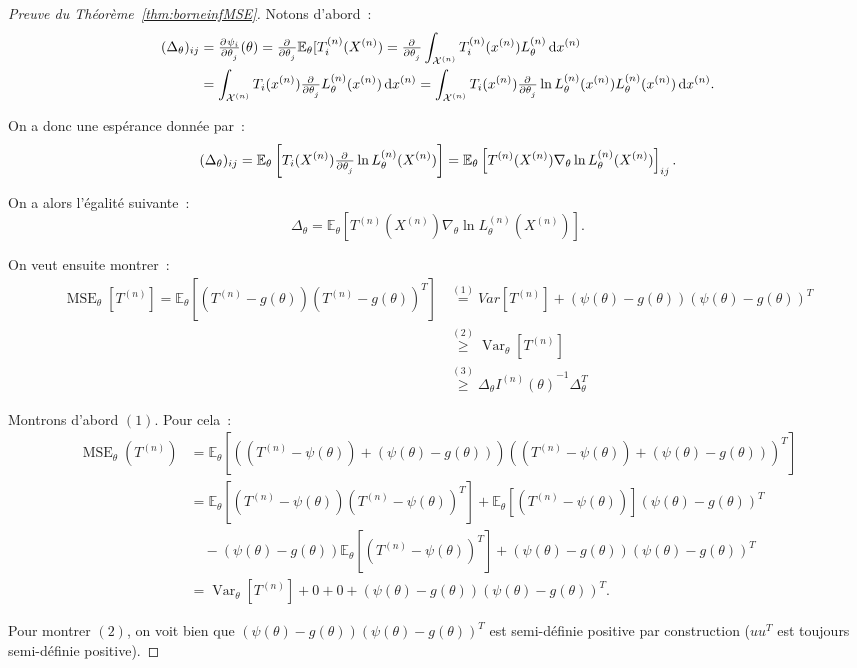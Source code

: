 \documentclass{report}
\DeclareMathOperator{\Var}{Var}
\DeclareMathOperator{\MSE}{MSE}
\newcommand{\E}{\mathbb E}
\newcommand{\n}{{(n)}}
\newcommand{\Xn}{{X^\n}}
\newcommand{\Tn}{{T^\n}}
\newcommand{\TnXn}{{\Tn(\Xn)}}
\theoremstyle{definition}
\theoremstyle{remark}
\begin{document}
			\begin{proof}[Preuve du Théorème~\ref{thm:borneinfMSE}] Notons d'abord~:
			\begin{align*} (\Delta_\theta)_{ij} &= \pd {\psi_i}{\theta_j}(\theta) = \pd {}{\theta_j}\E_\theta[T_i^{(n)}(\Xn)
				= \pd {}{\theta_j}\int_{\mathcal X^{(n)}}T_i^{(n)}(x^{(n)})L_\theta^{(n)}\dif x^{(n)} \\
			&= \int_{\mathcal X^{(n)}}T_i(x^{(n)})\pd {}{\theta_j}L_\theta^{(n)}(x^{(n)})\dif x^{(n)}
				= \int_{\mathcal X^{(n)}}T_i(x^{(n)})\pd {}{\theta_j}\ln L_\theta^{(n)}(x^{(n)})L_\theta^{(n)}(x^{(n)})\dif x^{(n)}.
			\end{align*}

			On a donc une espérance donnée par~:
			\[(\Delta_\theta)_{ij} = \E_\theta\left[T_i(X^{(n)})\pd {}{\theta_j}\ln L_\theta^{(n)}(X^{(n)})\right]
				= \E_\theta\left[\TnXn\nabla_\theta\ln L_\theta^{(n)}(X^{(n)})\right]_{ij}.\]

			On a alors l'égalité suivante~:
			\[\Delta_\theta = \E_\theta\left[\TnXn\nabla_\theta\ln L_\theta^{(n)}(X^{(n)})\right].\]

			On veut ensuite montrer~:
			\begin{align*}
				\MSE_\theta[\Tn] = \E_\theta\left[\left(\Tn - g(\theta)\right)\left(\Tn - g(\theta)\right)^T\right] &\overset {(1)}=
					Var[\Tn] + \left(\psi(\theta)-g(\theta)\right)\left(\psi(\theta)-g(\theta)\right)^T \\
				&\overset{(2)}\geq \Var_\theta[\Tn] \\
				&\overset{(3)}\geq \Delta_\theta{I^{(n)}(\theta)}^{-1}\Delta_\theta^T
			\end{align*}

			Montrons d'abord $(1)$. Pour cela~:
			\begin{align*}
				\MSE_\theta(\Tn) &= \E_\theta\left[\left((\Tn - \psi(\theta)) + (\psi(\theta) - g(\theta))\right)\left((\Tn - \psi(\theta)) + (\psi(\theta) - g(\theta))\right)^T\right] \\
				&=\E_\theta[(\Tn - \psi(\theta))(\Tn - \psi(\theta))^T] + \E_\theta[(\Tn - \psi(\theta))](\psi(\theta) - g(\theta))^T \\
				&\quad- (\psi(\theta) - g(\theta))\E_\theta[(\Tn - \psi(\theta))^T] + (\psi(\theta) - g(\theta))(\psi(\theta) - g(\theta))^T \\
				&= \Var_\theta[\Tn] + 0 + 0 + (\psi(\theta) - g(\theta))(\psi(\theta) - g(\theta))^T.
			\end{align*}

			Pour montrer $(2)$, on voit bien que $(\psi(\theta) - g(\theta))(\psi(\theta) - g(\theta))^T$ est semi-définie positive par construction ($uu^T$ est toujours
			semi-définie positive).


\end{proof}
\end{document}
